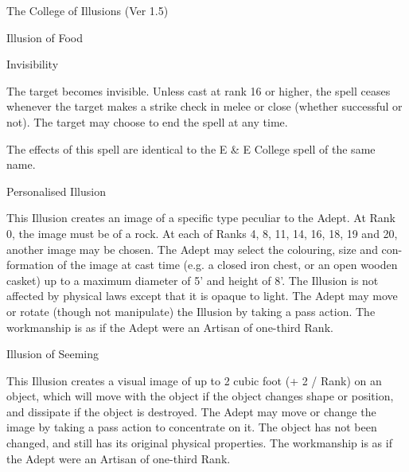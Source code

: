 \begin{Chapter}{The College of Illusions (Ver 1.5)}
\begin{spell}[G-3]{Illusion of Food }
\begin{effects}
\end{effects}
\end{spell}

\begin{spell}[G-4]{Invisibility }

\begin{effects}
 The  target  becomes  invisible.  Unless  cast 
at rank 16 or higher, the spell ceases whenever the 
target  makes  a  strike  check  in  melee  or  close 
(whether successful or not). The target may choose 
to end the spell at any time. 

The effects of this spell are identical to the E \& E College spell of
the same name.

\end{effects}
\end{spell}

\begin{spell}[G-5]{Personalised Illusion }

\begin{effects}
This Illusion creates an image of a specific 
type  peculiar  to  the  Adept.  At  Rank  0,  the  image 
must  be  of  a  rock.  At  each  of  Ranks  4,  8,  11,  14, 
16,  18,  19  and  20,  another  image  may  be  chosen. 
The Adept may select the colouring, size and con-
formation  of  the  image  at  cast  time  (e.g.  a  closed 
iron  chest,  or  an  open  wooden  casket)  up  to  a 
maximum  diameter  of  5’  and  height  of  8’.  The 
Illusion is not affected by physical laws except that 
it is opaque to light. The Adept may move or rotate 
(though  not  manipulate)  the  Illusion  by  taking  a 
pass  action.  The  workmanship  is  as  if  the  Adept 
were an Artisan of one-third Rank. 

\end{effects}
\end{spell}

\begin{spell}[G-6]{Illusion of Seeming }

\begin{effects}
 This  Illusion  creates  a  visual  image  of  up 
to  2  cubic  foot  (+  2  /  Rank)  on  an  object,  which 
will  move  with  the  object  if  the  object  changes 
shape  or  position,  and  dissipate  if  the  object  is 
destroyed.  The  Adept  may  move  or  change  the 
image by taking a pass action to concentrate on it. 
The  object  has  not  been  changed,  and  still  has  its 
original  physical  properties.  The  workmanship  is 
as if the Adept were an Artisan of one-third Rank. 


\end{effects}
\end{spell}
\end{Chapter}
